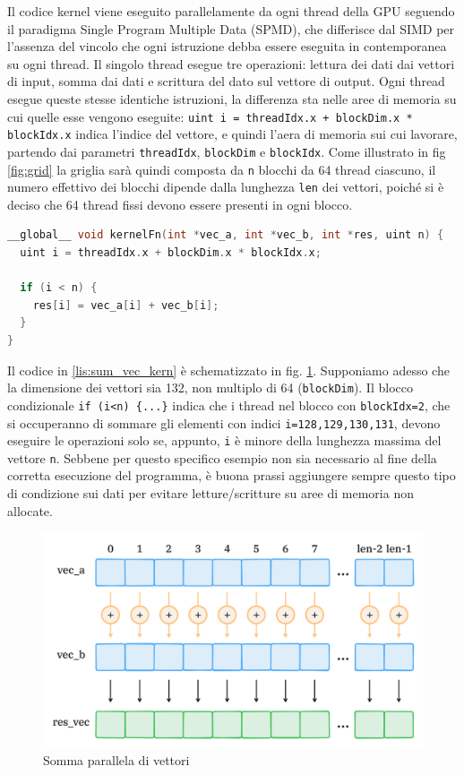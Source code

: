 Il codice kernel viene eseguito parallelamente da ogni thread della GPU seguendo il paradigma Single Program Multiple Data (\gls{SPMD}), che differisce dal SIMD per l'assenza del vincolo che ogni istruzione debba essere eseguita in contemporanea su ogni thread. Il singolo thread esegue tre operazioni: lettura dei dati dai vettori di input, somma dai dati e scrittura del dato sul vettore di output. Ogni thread esegue queste stesse identiche istruzioni, la differenza sta nelle aree di memoria su cui quelle esse vengono eseguite: \verb|uint i = threadIdx.x + blockDim.x * blockIdx.x| indica l'indice del vettore, e quindi l'aera di memoria sui cui lavorare, partendo dai parametri \verb|threadIdx|, \verb|blockDim| e \verb|blockIdx|. Come illustrato in fig \ref{fig:grid} la griglia sarà quindi composta da \verb|n| blocchi da 64 thread ciascuno, il numero effettivo dei blocchi dipende dalla lunghezza \verb|len| dei vettori, poiché si è deciso che 64 thread fissi devono essere presenti in ogni blocco.

\vspace{5mm}
\begin{lstlisting}[language=C++, caption=Kernel CUDA di somma di vettori, label=lis:sum_vec_kern]
__global__ void kernelFn(int *vec_a, int *vec_b, int *res, uint n) {
  uint i = threadIdx.x + blockDim.x * blockIdx.x;

  if (i < n) {
    res[i] = vec_a[i] + vec_b[i];
  }
}
\end{lstlisting}
\vspace{5mm}

Il codice in \ref{lis:sum_vec_kern} è schematizzato in fig. \ref{fig:sum_vec}. Supponiamo adesso che la dimensione dei vettori sia 132, non multiplo di 64 (\verb|blockDim|). Il blocco condizionale \verb|if (i<n) {...}| indica che i thread nel blocco con \verb|blockIdx=2|, che si occuperanno di sommare gli elementi con indici \verb|i=128,129,130,131|, devono eseguire le operazioni solo se, appunto, \verb|i| è minore della lunghezza massima del vettore \verb|n|. Sebbene per questo specifico esempio non sia necessario al fine della corretta esecuzione del programma, è buona prassi aggiungere sempre questo tipo di condizione sui dati per evitare letture/scritture su aree di memoria non allocate.

\begin{figure}[ht]
    \centering
    \includegraphics[width=.9\linewidth]{images/chapter2/sum_vec.png}
    \caption{Somma parallela di vettori}
    \label{fig:sum_vec}
\end{figure}

